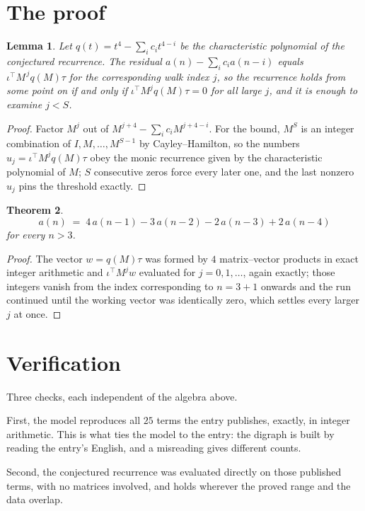 \documentclass[11pt,a4paper]{article}
\theoremstyle{plain}
\newtheorem{theorem}{Theorem}
\newtheorem{lemma}[theorem]{Lemma}
\theoremstyle{definition}
\begin{document}
\section{The proof}

\begin{lemma}\label{lem:crit}
Let $q(t)=t^{4}-\sum_i c_it^{4-i}$ be the characteristic polynomial of the
conjectured recurrence. The residual $a(n)-\sum_ic_ia(n-i)$ equals
$\iota^{\!\top}M^{\,j}q(M)\tau$ for the corresponding walk index $j$, so the recurrence
holds from some point on if and only if $\iota^{\!\top}M^{j}q(M)\tau=0$ for all large $j$,
and it is enough to examine $j<S$.
\end{lemma}

\begin{proof}
Factor $M^{j}$ out of $M^{j+4}-\sum_ic_iM^{j+4-i}$. For the bound, $M^{S}$
is an integer combination of $I,M,\dots,M^{S-1}$ by Cayley--Hamilton, so the numbers
$u_j=\iota^{\!\top}M^{j}q(M)\tau$ obey the monic recurrence given by the characteristic
polynomial of $M$; $S$ consecutive zeros force every later one, and the last nonzero $u_j$
pins the threshold exactly.
\end{proof}

\begin{theorem}
\[
a(n)\;=\;4\,a(n-1) - 3\,a(n-2) - 2\,a(n-3) + 2\,a(n-4)
\]
for every $n>3$.
\end{theorem}

\begin{proof}
The vector $w=q(M)\tau$ was formed by $4$ matrix--vector products in exact integer
arithmetic and $\iota^{\!\top}M^{j}w$ evaluated for $j=0,1,\dots$, again exactly; those
integers vanish from the index corresponding to $n=3+1$ onwards and the run continued
until the working vector was identically zero, which settles every larger $j$ at once.
\end{proof}

\section{Verification}

Three checks, each independent of the algebra above.

First, the model reproduces all $25$ terms the entry publishes, exactly, in integer
arithmetic. This is what ties the model to the entry: the digraph is built by reading the
entry's English, and a misreading gives different counts.

Second, the conjectured recurrence was evaluated directly on those published terms, with no
matrices involved, and holds wherever the proved range and the data overlap.
\end{document}
